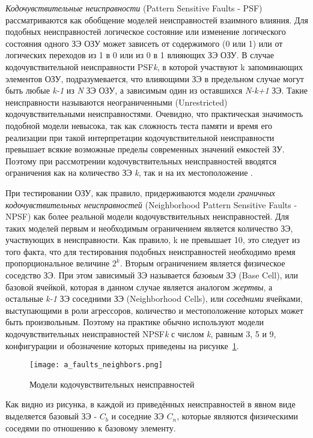 \textit{Кодочувствительные неисправности} (Pattern Sensitive Faults - PSF) рассматриваются как обобщение моделей неисправностей взаимного влияния. Для подобных неисправностей логическое состояние или изменение логического состояния одного ЗЭ ОЗУ может зависеть от содержимого (0 или 1) или от логических переходов из 1 в 0 или из 0 в 1 влияющих ЗЭ ОЗУ. В случае кодочувствительной неисправности PSF\textit{k}, в которой участвуют k запоминающих элементов ОЗУ, подразумевается, что влияющими ЗЭ в предельном случае могут быть любые \textit{k-1} из \textit{N} ЗЭ ОЗУ, а зависимым один из оставшихся \textit{N-k+1} ЗЭ. Такие неисправности называются неограниченными (Unrestricted) кодочувствительными неисправностями. Очевидно, что практическая значимость подобной модели невысока, так как сложность теста памяти и время его реализации при такой интерпретации кодочувствительной неисправности превышает всякие возможные пределы современных значений емкостей ЗУ. Поэтому при рассмотрении кодочувствительных неисправностей вводятся ограничения как на количество ЗЭ \textit{k}, так и на их местоположение \cite{faults}. 

При тестировании ОЗУ, как правило, придерживаются модели \textit{граничных кодочувствительных неисправностей} (Neighborhood Pattern Sensitive Faults - NPSF) как более реальной модели кодочувствительных неисправностей. Для таких моделей первым и необходимым ограничением является количество ЗЭ, участвующих в неисправности. Как правило, k не превышает 10, это следует из того факта, что для тестирования подобных неисправностей необходимо время пропорциональное величине $2^k$.
Вторым ограничением является физическое соседство ЗЭ. При этом зависимый ЗЭ называется \textit{базовым} ЗЭ (Base Cell), или базовой ячейкой, которая в данном случае является аналогом \textit{жертвы}, а остальные \textit{k-1} ЗЭ соседними ЗЭ (Neighborhood Cells), или \textit{соседними} ячейками, выступающими в роли агрессоров, количество и местоположение которых может быть произвольным. Поэтому на практике обычно используют модели кодочувствительных неисправностей NPSF\textit{k} с числом \textit{k}, равным 3, 5 и 9, конфигурации и обозначение которых приведены на рисунке~\ref{fig:domain:faults:neighbors}. 

\begin{figure}[ht]
\centering
  \texttt{[image: a\_faults\_neighbors.png]}  
  \caption{Модели кодочувствительных неисправностей}
  \label{fig:domain:faults:neighbors}
\end{figure}

Как видно из рисунка, в каждой из приведённых неисправностей в явном виде выделяется базовый ЗЭ - $C_b$ и соседние ЗЭ $C_n$, которые являются физическими соседями по отношению к базовому элементу.

